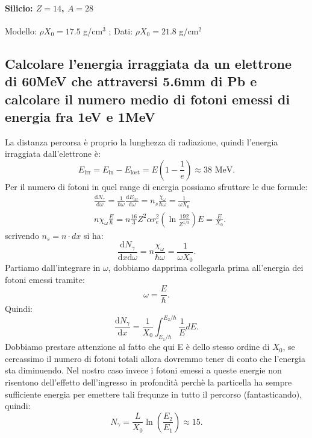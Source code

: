 \paragraph{Silicio: $Z=14$, $A=28$} Modello: $\rho X_0=17.5$ g/cm$^3$ ; Dati: $\rho X_0= 21.8$ g/cm$^2$

\subsection[]{Calcolare l'energia irraggiata da un elettrone di 60MeV che attraversi 5.6mm di Pb e calcolare il numero medio di fotoni emessi di energia fra 1eV e 1MeV
}
\label{sec:4.b.11}
La distanza percorsa è proprio la lunghezza di radiazione, quindi l'energia irraggiata dall'elettrone è: 
\[
	E_{\text{irr}}= E_{\text{in}}-E_{\text{lost}}= E\left( 1-\frac{1}{e} \right) \approx 38 \text{ MeV}
.\] 
Per il numero di fotoni in quel range di energia possiamo sfruttare le due formule:
\begin{align*}
	&\frac{\mbox{d} N_{\gamma}}{\mbox{d} \omega} = \frac{1}{\hbar \omega}\frac{\mbox{d} E_{\text{irr}}}{\mbox{d} \omega} = n_s \frac{\chi_{\omega}}{\hbar \omega}=
	\frac{1}{\omega X_0}\\
	&n \chi_{\omega}\frac{E}{\hbar} = n \frac{16}{3}Z^2\alpha r_e^2\left( \ln \frac{192}{Z^{1 /3}}  \right)E= \frac{E}{X_0}
.\end{align*}
scrivendo $n_s = n\cdot dx$ si ha:
 \[
	\frac{\mbox{d} N_{\gamma}}{\mbox{d}x \text{d}\omega}=n \frac{\chi_{\omega}}{\hbar \omega}=\frac{1}{\omega X_0} 
.\] 
Partiamo dall'integrare in $\omega$, dobbiamo dapprima collegarla prima all'energia dei fotoni emessi tramite:
\[
	\omega = \frac{E}{\hbar}
.\] 
Quindi:
\[
	\frac{\mbox{d} N_{\gamma}}{\mbox{d} x} = \frac{1}{X_0} \int_{E_1 /\hbar}^{E_2/\hbar} \frac{1}{E} dE   
.\] 
Dobbiamo prestare attenzione al fatto che qui E è dello stesso ordine di $X_0$, se cercassimo il numero di fotoni totali allora dovremmo tener di conto che l'energia sta diminuendo. Nel nostro caso invece i fotoni emessi a queste energie non risentono dell'effetto dell'ingresso in profondità perchè la particella ha sempre sufficiente energia per emettere tali frequnze in tutto il percorso (fantasticando), quindi:
\[
	N_{\gamma}= \frac{L}{X_0 } \ln\left( \frac{E_2}{E_1} \right) \approx 15
.\] 



